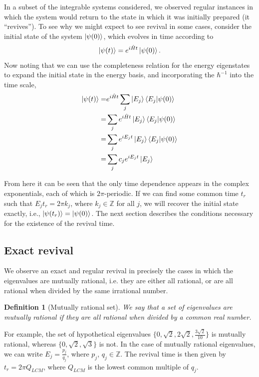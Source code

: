 \documentclass[a4paper,10pt]{article}
\theoremstyle{plain}
\newtheorem{definition}[]{Definition}
\begin{document}
In a subset of the integrable systems considered, we observed regular instances in which the system would return to the state in which it was initially prepared (it ``revives'').
To see why we might expect to see revival in some cases, consider the initial state of the system $\ket{\psi(0)}$, which evolves in time according to
\begin{equation}
 \ket{\psi(t)}=e^{i\hat{H}t}\ket{\psi(0)}.
\end{equation}
Now noting that we can use the completeness relation for the energy eigenstates to expand the initial state in the energy basis,
and incorporating the $\hbar^{-1}$ into the time scale,
\begin{align}
 \ket{\psi(t)} =&       e^{i\hat{H}t}\sum_j\ket{E_j}\braket{E_j|\psi(0)}  \nonumber \\
               =&\sum_je^{i\hat{H}t}\ket{E_j}\braket{E_j|\psi(0)} \nonumber \\
                =&\sum_je^{iE_{j}t}\ket{E_j}\braket{E_j|\psi(0)}  \nonumber \\
                =&\sum_j c_{j}e^{iE_{j}t}\ket{E_j}
\end{align}

From here it can be seen that the only time dependence appears in the complex exponentials, each of which is $2\pi$-periodic. If we can find some common time $t_r$ such
that $E_{j} t_{r}=2 \pi k_{j}$, where $k_{j} \in \mathbb{Z} $ for all $j$, we will recover the initial state exactly, i.e., $\ket{\psi(t_{r})}=\ket{\psi(0)}$.
The next section describes the conditions necessary for the existence of the revival time.\\


\subsection{Exact revival}

We observe an exact and regular revival in precisely the cases in which the
eigenvalues are mutually rational, i.e. they are either all rational, or are all
rational when divided by the same irrational number.
\begin{definition}[Mutually rational set]
    We say that a set of eigenvalues are mutually rational if they are all
    rational when divided by a common real number.
\end{definition}




For example, the set of
hypothetical eigenvalues $\lbrace 0, \sqrt{2}, 2 \sqrt{2}, \frac{3 \sqrt{2}}{10}
\rbrace$ is mutually rational, whereas $\lbrace 0, \sqrt{2}, \sqrt{3}\rbrace$ is
not. In the case of mutually rational eigenvalues, we can write $E_{j} =
\frac{p_{j}}{q_{j}}$, where $p_{j}$, $q_{j} \in \mathbb{Z}$. The revival time is
then given by $t_{r} = 2\pi Q_{LCM}$, where $Q_{LCM}$ is the lowest common
multiple of ${q_j}$.
\end{document}
